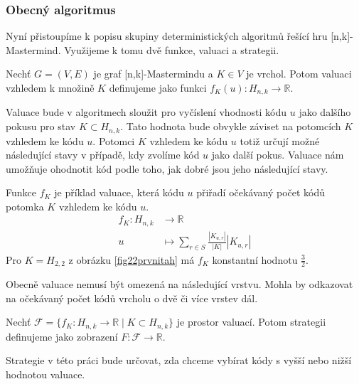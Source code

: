 

\subsubsection{Obecný algoritmus}
Nyní přistoupíme k popisu skupiny deterministických algoritmů řešící hru [n,k]-Mastermind. Využijeme k tomu dvě funkce, valuaci a strategii.
\begin{definice}[Valuace]
    Nechť $G = (V,E)$ je graf [n,k]-Mastermindu a $K \in V$ je vrchol. Potom valuaci vzhledem k množině $K$ definujeme jako funkci $f_K(u) \colon H_{n,k} \to \mathbb{R}$.
\end{definice}
Valuace bude v algoritmech sloužit pro vyčíslení vhodnosti kódu $u$ jako dalšího pokusu pro stav $K\subset H_{n,k}$. Tato hodnota bude obvykle záviset na potomcích $K$ vzhledem ke kódu $u$. Potomci $K$ vzhledem ke kódu $u$ totiž určují možné následující stavy v případě, kdy zvolíme kód $u$ jako další pokus. Valuace nám umožňuje ohodnotit kód podle toho, jak dobré jsou jeho následující stavy. 

\begin{prikl}\label{prjednokrokfce}
    Funkce $f_K$ je příklad valuace, která kódu $u$ přiřadí očekávaný počet kódů potomka $K$ vzhledem ke kódu $u$.
    \begin{align*}
        f_K \colon H_{n,k} &\to \mathbb{R} \\
        u &\mapsto \sum_{r\in S}\frac{|K_{u,r}|}{|K|}|K_{u,r}| 
    \end{align*}
    Pro $K = H_{2,2}$ z obrázku \ref{fig22prvnitah} má $f_{K}$ konstantní hodnotu $\frac{3}{2}$.
\end{prikl}
Obecně valuace nemusí být omezená na následující vrstvu. Mohla by odkazovat na očekávaný počet kódů vrcholu o dvě či více vrstev dál. 

\begin{definice}[Strategie]
    Nechť $\mathcal{F} = \{f_K\colon H_{n,k} \to \mathbb{R} \mid K \subset H_{n,k}\}$ je prostor valuací. Potom strategii definujeme jako zobrazení $F \colon \mathcal{F} \to \mathbb{R}$. 
\end{definice}
Strategie v této práci bude určovat, zda chceme vybírat kódy s vyšší nebo nižší hodnotou valuace.

